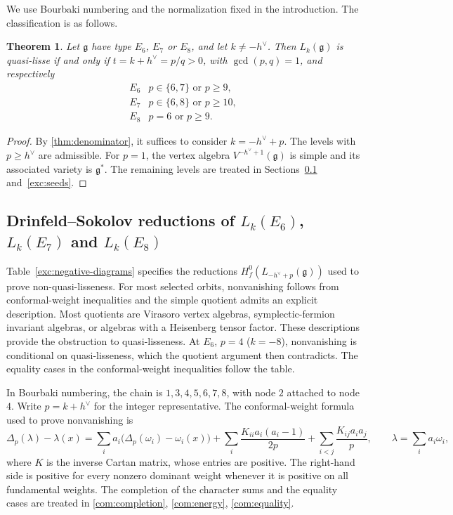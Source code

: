 \documentclass[11pt,a4paper]{amsart}
\numberwithin{equation}{section}
\newtheorem{theorem}{Theorem}[section]
\theoremstyle{definition}
\theoremstyle{remark}
\newcommand{\g}{\mathfrak g}
\begin{document}
We use Bourbaki numbering and the normalization fixed in the introduction.
The classification is as follows.
\begin{theorem}\label{thm:exceptional-e}
Let $\g$ have type $E_6$, $E_7$ or $E_8$, and let $k\ne-h^\vee$.
Then $L_k(\g)$ is quasi-lisse if and only if
$t=k+h^\vee=p/q>0$, with $\gcd(p,q)=1$, and respectively
$$
 \begin{array}{c|l}
 E_6&p\in\{6,7\}\text{ or }p\ge9,\\
 E_7&p\in\{6,8\}\text{ or }p\ge10,\\
 E_8&p=6\text{ or }p\ge9.
 \end{array}
$$
\end{theorem}
\begin{proof}
By \cref{thm:denominator}, it suffices to consider $k=-h^\vee+p$.
The levels with $p\ge h^\vee$ are admissible. For $p=1$, the vertex
algebra $V^{-h^\vee+1}(\g)$ is simple and its associated variety is
$\g^*$. The remaining levels are treated in
Sections~\ref{exc:negative} and~\ref{exc:seeds}.
\end{proof}

\subsection{\texorpdfstring{Drinfeld--Sokolov reductions of $L_k(E_6)$, $L_k(E_7)$ and $L_k(E_8)$}{Drinfeld--Sokolov reductions of Lk(E6), Lk(E7) and Lk(E8)}}
\label{exc:negative}
Table~\ref{exc:negative-diagrams} specifies the reductions
$H_f^0(L_{-h^\vee+p}(\g))$ used to prove non-quasi-lisseness.
For most selected orbits, nonvanishing follows from conformal-weight
inequalities and the simple quotient admits an explicit description.
Most quotients are Virasoro vertex algebras,
symplectic-fermion invariant algebras, or algebras with a Heisenberg
tensor factor. These descriptions provide the obstruction to
quasi-lisseness. At $E_6$, $p=4$ ($k=-8$), nonvanishing is conditional
on quasi-lisseness, which the quotient argument then contradicts.
The equality cases in the conformal-weight inequalities follow the table.

In Bourbaki numbering, the chain is $1,3,4,5,6,7,8$, with node $2$
attached to node $4$. Write $p=k+h^\vee$ for the integer representative.
The conformal-weight formula used to prove nonvanishing is
\begin{equation}\label{exc:energy}
 \Delta_p(\lambda)-\lambda(x)
 =\sum_i a_i\bigl(\Delta_p(\omega_i)-\omega_i(x)\bigr)
 +\sum_i\frac{K_{ii}a_i(a_i-1)}{2p}
 +\sum_{i<j}\frac{K_{ij}a_i a_j}{p},
 \qquad\lambda=\sum_i a_i\omega_i,
\end{equation}
where $K$ is the inverse Cartan matrix, whose entries are positive. The right-hand side is positive for every nonzero dominant weight
whenever it is positive on all fundamental weights.
The completion of the character sums and the equality cases are treated in
\cref{com:completion}, \cref{com:energy}, \cref{com:equality}.
\end{document}
